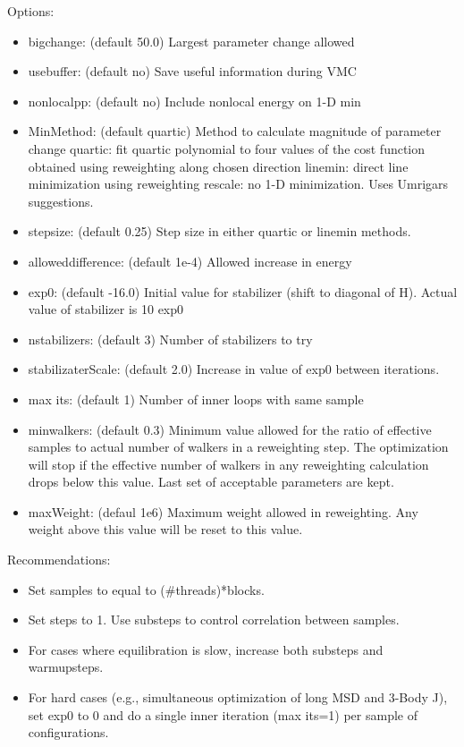 Options:
\begin{itemize}
  \item{bigchange: (default 50.0) Largest parameter change allowed}
  \item{usebuffer: (default no) Save useful information during VMC}
  \item{nonlocalpp: (default no) Include nonlocal energy on 1-D min}
  \item{MinMethod: (default quartic) Method to calculate magnitude of parameter change
quartic: fit quartic polynomial to four values of the cost function obtained using reweighting 
along chosen direction linemin: direct line minimization using reweighting rescale:
no 1-D minimization. Uses Umrigars suggestions.}
  \item{stepsize: (default 0.25) Step size in either quartic or linemin methods.}
  \item{alloweddifference: (default 1e-4) Allowed increase in energy}
  \item{exp0: (default -16.0) Initial value for stabilizer (shift to diagonal of H). Actual value
of stabilizer is 10 exp0}
  \item{nstabilizers: (default 3) Number of stabilizers to try}
  \item{stabilizaterScale: (default 2.0) Increase in value of exp0 between iterations.}
  \item{max its: (default 1) Number of inner loops with same sample}
  \item{minwalkers: (default 0.3) Minimum value allowed for the ratio of effective samples
to actual number of walkers in a reweighting step. The optimization will stop if the
effective number of walkers in any reweighting calculation drops below this value. Last
set of acceptable parameters are kept.}
  \item{maxWeight: (defaul 1e6) Maximum weight allowed in reweighting. Any weight above
this value will be reset to this value.}
\end{itemize}

Recommendations:
\begin{itemize}
  \item{Set samples to equal to (\#threads)*blocks.}
  \item{Set steps to 1. Use substeps to control correlation between samples.}
  \item{For cases where equilibration is slow, increase both substeps and warmupsteps.}
  \item{For hard cases (e.g., simultaneous optimization of long MSD and 3-Body J), set exp0
to 0 and do a single inner iteration (max its=1) per sample of configurations.}
\end{itemize}


